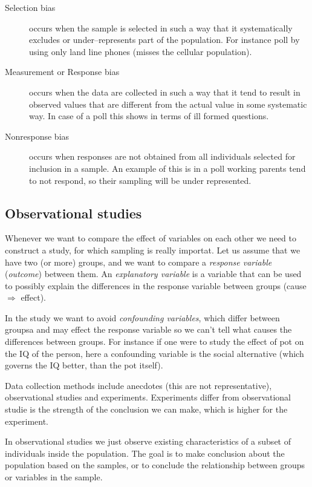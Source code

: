 \begin{description}
  \item[Selection bias] occurs when the sample is selected in such a way that it
  systematically excludes or under--represents part of the population. For
  instance poll by using only land line phones (misses the cellular population).
  \item[Measurement or Response bias] occurs when the data are collected in such
  a way that it tend to result in observed values that are different from the
  actual value in some systematic way. In case of a poll this shows in terms of
  ill formed questions.
  \item[Nonresponse bias] occurs when responses are not obtained from all
  individuals selected for inclusion in a sample. An example of this is in a
  poll working parents tend to not respond, so their sampling will be under
  represented.
\end{description}

\subsection{Observational studies}

Whenever we want to compare the effect of variables on each other we need to
construct a study, for which sampling is really importat. Let us assume that we
have two (or more) groups,  and we want to compare a \emph{response variable}
(\emph{outcome}) between them. An \emph{explanatory variable} is a variable that
can be used to possibly explain the differences in the response variable between
groups (cause $\Rightarrow$ effect).

In the study we want to avoid \emph{confounding variables}, which differ between
groupsa and may effect the response variable so we can't tell what causes the
differences between groups. For instance if one were to study the effect of pot
on the IQ of the person, here a confounding variable is the social alternative
(which governs the IQ better, than the pot itself). 

Data collection methods include anecdotes (this are not representative),
observational studies and experiments. Experiments differ from observational
studie is the strength of the conclusion we can make, which is higher for the
experiment.

In observational studies we just observe existing characteristics of a subset of
individuals inside the population. The goal is to make conclusion about the
population based on the samples, or to conclude the relationship between groups
or variables in the sample. 

